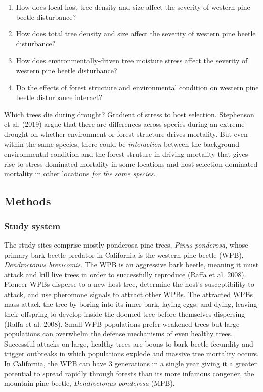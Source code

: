 \documentclass[]{article}
\begin{document}
\begin{enumerate}
\def\labelenumi{\arabic{enumi}.}
\item
  How does local host tree density and size affect the severity of
  western pine beetle disturbance?
\item
  How does total tree density and size affect the severity of western
  pine beetle disturbance?
\item
  How does environmentally-driven tree moisture stress affect the
  severity of western pine beetle disturbance?
\item
  Do the effects of forest structure and environmental condition on
  western pine beetle disturbance interact?
\end{enumerate}

Which trees die during drought? Gradient of stress to host selection.
Stephenson et al. (2019) argue that there are differences across species
during an extreme drought on whether environment or forest structure
drives mortality. But even within the same species, there could be
\emph{interaction} between the background environmental condition and
the forest struture in driving mortality that gives rise to
stress-dominated mortality in some locations and host-selection
dominated mortality in other locations \emph{for the same species}.

\subsection{Methods}\label{methods}

\subsubsection{Study system}\label{study-system}

The study sites comprise mostly ponderosa pine trees, \emph{Pinus
ponderosa}, whose primary bark beetle predator in California is the
western pine beetle (WPB), \emph{Dendroctonus brevicomis}. The WPB is an
aggressive bark beetle, meaning it must attack and kill live trees in
order to successfully reproduce (Raffa et al. 2008). Pioneer WPBs
disperse to a new host tree, determine the host's susceptibility to
attack, and use pheromone signals to attract other WPBs. The attracted
WPBs mass attack the tree by boring into its inner bark, laying eggs,
and dying, leaving their offspring to develop inside the doomed tree
before themselves dispersing (Raffa et al. 2008). Small WPB populations
prefer weakened trees but large populations can overwhelm the defense
mechanisms of even healthy trees. Successful attacks on large, healthy
trees are boons to bark beetle fecundity and trigger outbreaks in which
populations explode and massive tree mortality occurs. In California,
the WPB can have 3 generations in a single year giving it a greater
potential to spread rapidly through forests than its more infamous
congener, the mountain pine beetle, \emph{Dendroctonus ponderosa} (MPB).
\end{document}
